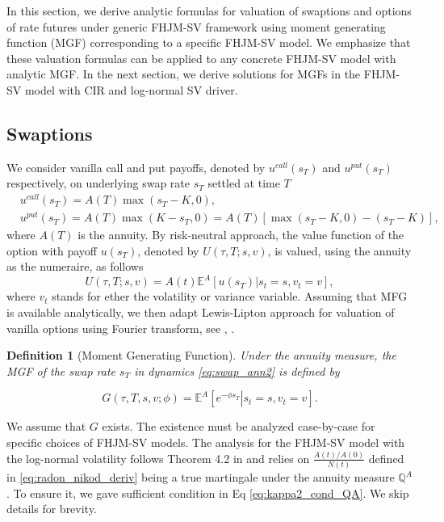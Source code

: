 \documentclass[pdftex,11pt,a4paper] {article}
\newtheorem{definition}{Definition}[section]
\begin{document}
In this section, we derive analytic formulas for valuation of swaptions and options of rate futures under generic FHJM-SV framework using moment generating function (MGF) corresponding to a specific FHJM-SV model. We emphasize that these valuation formulas can be applied to any concrete FHJM-SV model with analytic MGF. In the next section, we derive solutions for MGFs in the FHJM-SV model with CIR and log-normal SV driver. 


\subsection{Swaptions}

We consider vanilla call and put payoffs, denoted by $u^{call}(s_T)$ and $u^{put}(s_T)$ respectively, on underlying swap rate $s_T$ settled at time $T$
\begin{equation*}
\begin{split}
&u^{call}(s_T)=A(T)\max(s_T-K,0),\\
&u^{put}(s_T)=A(T)\max(K-s_T,0)=A(T)\left[\max(s_T-K,0)-(s_T-K)\right],
\end{split}
\end{equation*}
where $A(T)$ is the annuity.
By risk-neutral approach, the value function of the option with payoff $u(s_T)$, denoted by $U(\tau, T; s, v)$, is valued, using the annuity as the numeraire, as follows 
\begin{equation}\label{eq::call_swap}
U(\tau, T; s, v)=A(t)\mathbb{E}^A\left[\left.u(s_T)\right|s_t=s,v_t=v\right],
\end{equation}
where $v_t$ stands for ether the volatility or variance variable. Assuming that MFG is available analytically, we then adapt Lewis-Lipton approach for valuation of vanilla options using Fourier transform, see \cite{Lewis2000}, \cite{Lipton2001}. 


\begin{definition}[Moment Generating Function] Under the annuity measure, the MGF of the swap rate $s_T$ in dynamics \eqref{eq:swap_ann2} is defined by

\begin{equation}\label{eq:s_mgf}
G(\tau,T,s,v; \phi)=\mathbb{E}^A\left[\left.e^{-\phi s_T}\right|s_t=s,v_t=v\right].
\end{equation}

\end{definition}

We assume that $G$ exists. The existence must be analyzed case-by-case for specific choices of FHJM-SV models. The analysis for the FHJM-SV model with the log-normal volatility follows Theorem 4.2 in \cite{Sepp2024} and relies on $\frac{A(t)/A(0)}{N(t)}$ defined in \eqref{eq:radon_nikod_deriv} being a true martingale under the annuity measure $\mathbb{Q}^A$. To ensure it, we gave sufficient condition in Eq \eqref{eq:kappa2_cond_QA}. We skip details for brevity.
\end{document}
